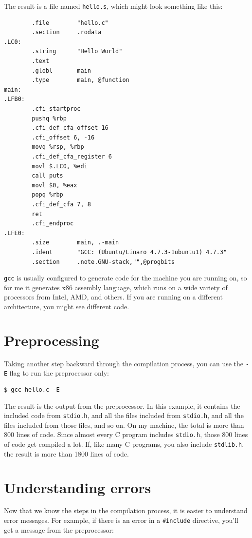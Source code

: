 \documentclass[12pt]{book}
\begin{document}
{The result is a file named {\tt hello.s}, which might look something like
this:

\begin{verbatim}
        .file        "hello.c"
        .section     .rodata
.LC0:
        .string      "Hello World"
        .text
        .globl       main
        .type        main, @function
main:
.LFB0:
        .cfi_startproc
        pushq %rbp
        .cfi_def_cfa_offset 16
        .cfi_offset 6, -16
        movq %rsp, %rbp
        .cfi_def_cfa_register 6
        movl $.LC0, %edi
        call puts
        movl $0, %eax
        popq %rbp
        .cfi_def_cfa 7, 8
        ret
        .cfi_endproc
.LFE0:
        .size        main, .-main
        .ident       "GCC: (Ubuntu/Linaro 4.7.3-1ubuntu1) 4.7.3"
        .section     .note.GNU-stack,"",@progbits
\end{verbatim}

{\tt gcc} is usually configured to generate code for the machine you
are running on, so for me it generates x86 assembly language,
which runs on a wide variety of processors from Intel, AMD, and
others.  If you are running on a different architecture, you might
see different code.


\section{Preprocessing}

Taking another step backward through the compilation process, you
can use the {\tt -E} flag to run the preprocessor only:

\begin{verbatim}
$ gcc hello.c -E
\end{verbatim}

The result is the output from the preprocessor.  In this example,
it contains the included code from {\tt stdio.h}, and all the files
included from {\tt stdio.h}, and all the files included from those
files, and so on.  On my machine, the total is more than 800 lines
of code.  Since almost every C program includes {\tt stdio.h}, those
800 lines of code get compiled a lot.  If, like many C programs,
you also include {\tt stdlib.h}, the result is more than 1800 lines
of code.


\section{Understanding errors}

Now that we know the steps in the compilation process, it is easier
to understand error messages.  For example, if there is an error
in a \verb"#include" directive, you'll get a message from the
preprocessor:

}
\end{document}
